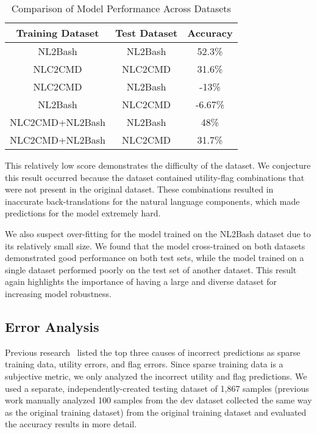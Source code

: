 \documentclass{river-journal}
\begin{document}
\begin{table}[tbph]
\begin{center}
 \caption{\label{table:modelperf_data} Comparison of Model Performance Across Datasets}
\begin{tabular}{|c|c|c|}
\hline
\textbf{Training Dataset}  & \textbf{Test Dataset} & \textbf{Accuracy}\\
\hline
NL2Bash & NL2Bash & 52.3\%\\
\hline
NLC2CMD & NLC2CMD & 31.6\%\\
\hline
NLC2CMD & NL2Bash & -13\%\\
\hline
NL2Bash & NLC2CMD & -6.67\%\\
\hline
NLC2CMD+NL2Bash & NL2Bash & 48\%\\
\hline
NLC2CMD+NL2Bash & NLC2CMD & 31.7\%\\
\hline
\end{tabular}
\end{center}
\vspace{-0.2in}
\end{table}


This relatively low score demonstrates the difficulty of the dataset. We conjecture this result occurred because the dataset contained utility-flag combinations that were not present in the original dataset. These combinations resulted in inaccurate back-translations for the natural language components, which made predictions for the model extremely hard.

We also suspect over-fitting for the model trained on the NL2Bash dataset due to its relatively small size. We found that the model cross-trained on both datasets demonstrated good performance on both test sets, while the model trained on a single dataset performed poorly on the test set of another dataset. This result again highlights the importance of having a large and diverse dataset for increasing model robustness.

\subsection{Error Analysis} 
\label{metricerr.errror}

Previous research~\cite{Lin2018NL2BashAC} listed the top three causes of incorrect predictions as sparse training data, utility errors, and flag errors. Since sparse training data is a subjective metric, we only analyzed the incorrect utility and flag predictions. We used a separate, independently-created testing dataset of 1,867 samples (previous work manually analyzed 100 samples from the dev dataset collected the same way as the original training dataset) from the original training dataset and evaluated the accuracy results in more detail. 
\end{document}
